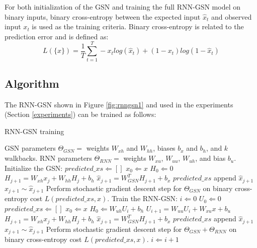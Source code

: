 For both initialization of the GSN and training the full RNN-GSN model on binary inputs, binary cross-entropy between the expected input $\hat{x}_t$ and observed input $x_t$ is used as the training criteria. Binary cross-entropy is related to the prediction error and is defined as:
\begin{equation}
L(\{x\}) = \frac{1}{T} \sum\limits_{t=1}^T -x_t log(\hat{x}_t) + (1-x_t) log(1-\hat{x}_t)
 \end{equation} 

\subsection{Algorithm}
The RNN-GSN shown in Figure \ref{fig:rnngsn1} and used in the experiments (Section \ref{experiments}) can be trained as follows:
\begin{algorithm}
\caption{RNN-GSN training}\label{algo}
\begin{algorithmic}
	\STATE GSN parameters $\Theta_{GSN} =$ weights $W_{xh}$ and $W_{hh}$, biases $b_x$ and $b_h$, and $k$ walkbacks.
	\STATE RNN parameters $\Theta_{RNN} =$ weights $W_{xu}$, $W_{uu}$, $W_{uh}$, and bias $b_u$.
	\STATE Initialize the GSN:
		\STATE $predicted\_xs \Leftarrow []$
		\STATE $x_0 \Leftarrow x$
		\STATE $H_0 \Leftarrow 0$
			\STATE $H_{j+1} = W_{xh}x_j + W_{hh}H_{j} + b_h$
			\STATE $\hat{x}_{j+1} = W_{GSN}^T H_{j+1} + b_x$
			\STATE $predicted\_xs$ append $\hat{x}_{j+1}$
			\STATE $x_{j+1}\sim \hat{x}_{j+1}$
		\ENDFOR
		\STATE Perform stochastic gradient descent step for $\Theta_{GSN}$ on binary cross-entropy cost $L(predicted\_xs, x)$.
	\ENDFOR
	\STATE Train the RNN-GSN:
	\STATE $i \Leftarrow 0$
	\STATE $U_0 \Leftarrow 0$
		\STATE $predicted\_xs \Leftarrow []$
		\STATE $x_0 \Leftarrow x$
		\STATE $H_0 \Leftarrow W_{uh}U_i + b_h$
		\STATE $U_{i+1} = W_{uu}U_i + W_{xu}x + b_u$
			\STATE $H_{j+1} = W_{xh}x_j + W_{hh}H_{j} + b_h$
			\STATE $\hat{x}_{j+1} = W_{GSN}^T H_{j+1} + b_x$
			\STATE $predicted\_xs$ append $\hat{x}_{j+1}$
			\STATE $x_{j+1}\sim \hat{x}_{j+1}$
		\ENDFOR
		\STATE Perform stochastic gradient descent step for $\Theta_{GSN} + \Theta_{RNN}$ on binary cross-entropy cost $L(predicted\_xs, x)$.
		\STATE $i \Leftarrow i+1$
	\ENDFOR
\end{algorithmic}
\end{algorithm}

